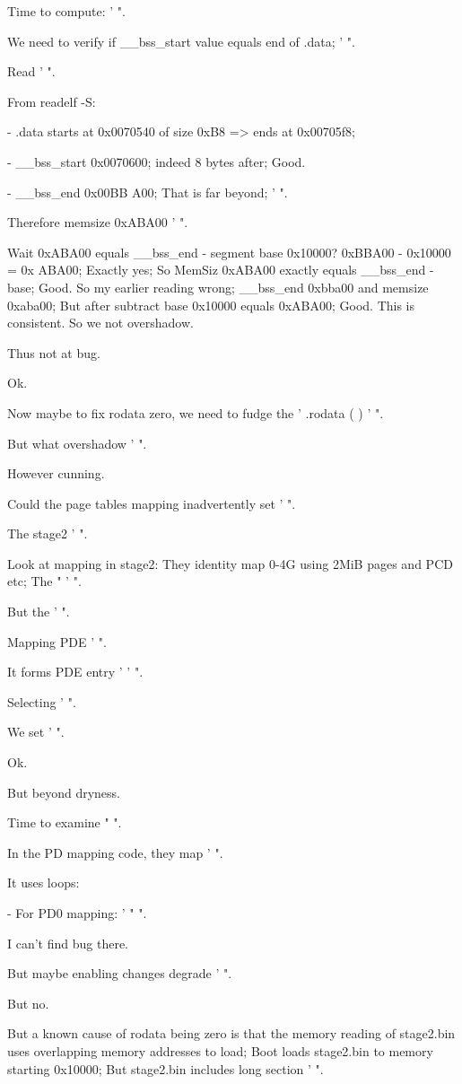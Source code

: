 \begin{decodedreasoningpanel}
Time to compute: ' ".

We need to verify if \_\_bss\_start value equals end of .data; ' ".

Read ' ".

From readelf -S:

- .data starts at 0x0070540 of size 0xB8 => ends at 0x00705f8;

- \_\_bss\_start 0x0070600; indeed 8 bytes after; Good.

- \_\_bss\_end 0x00BB A00; That is far beyond; ' ".

Therefore memsize 0xABA00 ' ".

Wait 0xABA00 equals \_\_bss\_end - segment base 0x10000? 0xBBA00 - 0x10000 = 0x ABA00; Exactly yes; So MemSiz 0xABA00 exactly equals \_\_bss\_end - base; Good. So my earlier reading wrong; \_\_bss\_end 0xbba00 and memsize 0xaba00; But after subtract base 0x10000 equals 0xABA00; Good. This is consistent. So we not overshadow.

Thus not at bug.

Ok.

Now maybe to fix rodata zero, we need to fudge the ' .rodata ( ) ' ".

But what overshadow ' ".

However cunning.

Could the page tables mapping inadvertently set ' ".

The stage2 ' ".

Look at mapping in stage2: They identity map 0-4G using 2MiB pages and PCD etc; The " ' ".

But the ' ".

Mapping PDE ' ".

It forms PDE entry ' ' ".

Selecting ' ".

We set ' ".

Ok.

But beyond dryness.

Time to examine " ".

In the PD mapping code, they map ' ".

It uses loops:

- For PD0 mapping: ' " ".

I can't find bug there.

But maybe enabling changes degrade ' ".

But no.

But a known cause of rodata being zero is that the memory reading of stage2.bin uses overlapping memory addresses to load; Boot loads stage2.bin to memory starting 0x10000; But stage2.bin includes long section ' ".


\end{decodedreasoningpanel}
